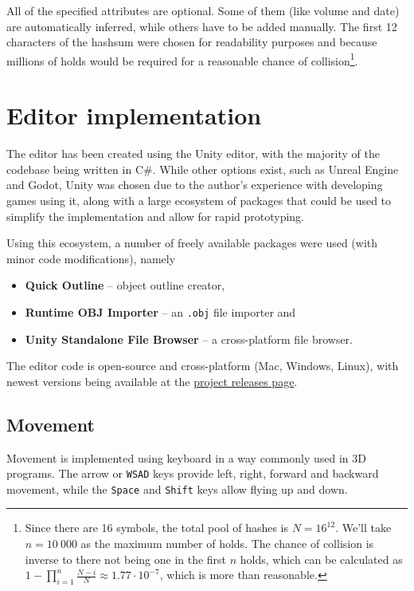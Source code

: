All of the specified attributes are optional.
Some of them (like volume and date) are automatically inferred, while others have to be added manually.
The first 12 characters of the hashsum were chosen for readability purposes and because millions of holds would be required for a reasonable chance of collision\footnote{Since there are 16 symbols, the total pool of hashes is $N = 16^{12}$. We'll take $n = 10\ 000$ as the maximum number of holds. The chance of collision is inverse to there not being one in the first $n$ holds, which can be calculated as $1 - \prod_{i = 1}^{n} \frac{N - i}{N} \approx 1.77 \cdot 10^{-7}$, which is more than reasonable.}.

\section{Editor implementation}
The editor has been created using the Unity editor, with the majority of the codebase being written in C\#.
While other options exist, such as Unreal Engine and Godot, Unity was chosen due to the author's experience with developing games using it, along with a large ecosystem of packages that could be used to simplify the implementation and allow for rapid prototyping.

Using this ecosystem, a number of freely available packages were used (with minor code modifications), namely

\begin{itemize}
	\item \textbf{Quick Outline} \cite{quickoutline} -- object outline creator,
	\item \textbf{Runtime OBJ Importer} \cite{objimport} -- an \verb|.obj| file importer and
	\item \textbf{Unity Standalone File Browser} \cite{unitystandalonefilebrowser} -- a cross-platform file browser.
\end{itemize}

The editor code is open-source and cross-platform (Mac, Windows, Linux), with newest versions being available at the \href{https://github.com/Climber-Tools/Cled/releases}{project releases page}.

\subsection{Movement}
Movement is implemented using keyboard in a way commonly used in 3D programs.
The arrow or \verb|WSAD| keys provide left, right, forward and backward movement, while the \verb|Space| and \verb|Shift| keys allow flying up and down.

